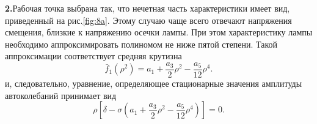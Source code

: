 {\bfseries 2.}Рабочая точка выбрана так, что нечетная часть характеристики имеет вид, приведенный на рис.\ref{fig:8a}. Этому случаю чаще всего отвечают напряжения смещения, близкие к напряжению осечки лампы. При этом характеристику лампы необходимо аппроксимировать полиномом не ниже пятой степени. Такой аппроксимации соответствует средняя крутизна
\begin{equation}
\label{eq:22}
\bar{f}_1(\rho^2)=a_1+\frac{a_3}{2}\rho^2-\frac{a_5}{12}\rho^4.
\end{equation}
и, следовательно, уравнение, определяющее стационарные значения амплитуды автоколебаний принимает вид
\begin{equation}
\label{eq:23}
\rho[\delta-\sigma(a_1+\frac{a_3}{2}\rho^2-\frac{a_5}{12}\rho^4)]=0.
\end{equation}


